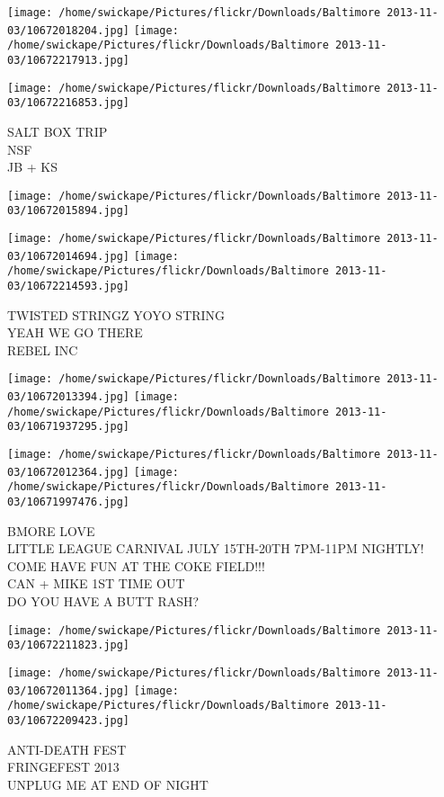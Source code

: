 \documentclass[10pt,letterpaper]{article}
\begin{document}
\texttt{[image: /home/swickape/Pictures/flickr/Downloads/Baltimore 2013-11-03/10672018204.jpg]}
\texttt{[image: /home/swickape/Pictures/flickr/Downloads/Baltimore 2013-11-03/10672217913.jpg]}

\vspace{0.25in}
\texttt{[image: /home/swickape/Pictures/flickr/Downloads/Baltimore 2013-11-03/10672216853.jpg]}

SALT BOX TRIP\\
NSF\\
JB + KS\\
\pagebreak

\texttt{[image: /home/swickape/Pictures/flickr/Downloads/Baltimore 2013-11-03/10672015894.jpg]}

\vspace{0.25in}
\texttt{[image: /home/swickape/Pictures/flickr/Downloads/Baltimore 2013-11-03/10672014694.jpg]}
\texttt{[image: /home/swickape/Pictures/flickr/Downloads/Baltimore 2013-11-03/10672214593.jpg]}

TWISTED STRINGZ YOYO STRING\\
YEAH WE GO THERE\\
REBEL INC\\
\pagebreak

\texttt{[image: /home/swickape/Pictures/flickr/Downloads/Baltimore 2013-11-03/10672013394.jpg]}
\texttt{[image: /home/swickape/Pictures/flickr/Downloads/Baltimore 2013-11-03/10671937295.jpg]}

\texttt{[image: /home/swickape/Pictures/flickr/Downloads/Baltimore 2013-11-03/10672012364.jpg]}
\texttt{[image: /home/swickape/Pictures/flickr/Downloads/Baltimore 2013-11-03/10671997476.jpg]}

BMORE LOVE\\
LITTLE LEAGUE CARNIVAL JULY 15TH{-}20TH 7PM{-}11PM NIGHTLY! COME HAVE FUN AT THE COKE FIELD!!!\\
CAN + MIKE 1ST TIME OUT\\
DO YOU HAVE A BUTT RASH?\\
\pagebreak

\texttt{[image: /home/swickape/Pictures/flickr/Downloads/Baltimore 2013-11-03/10672211823.jpg]}

\vspace{0.25in}
\texttt{[image: /home/swickape/Pictures/flickr/Downloads/Baltimore 2013-11-03/10672011364.jpg]}
\texttt{[image: /home/swickape/Pictures/flickr/Downloads/Baltimore 2013-11-03/10672209423.jpg]}

ANTI{-}DEATH FEST\\
FRINGEFEST 2013\\
UNPLUG ME AT END OF NIGHT\\
\pagebreak
\end{document}
